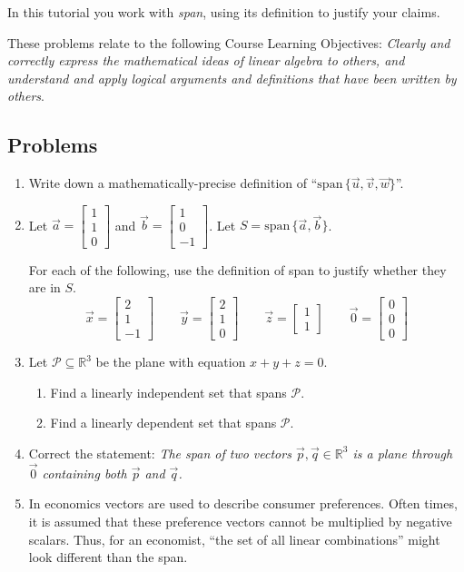 \documentclass[red]{tutorial}
\newcommand{\R}{\mathbb{R}}
\newcommand{\Span}{\mathrm{span}\,}
\newcommand{\mat}[1]{\begin{bmatrix}#1\end{bmatrix}}
\theoremstyle{definition}
\theoremstyle{theorem}
\begin{document}
	\begin{tutorial}
		\begin{objectives}
			In this tutorial you work with \emph{span}, using its definition to justify
			your claims.

	These problems relate to the following Course Learning Objectives:
			\textit{Clearly and correctly express the mathematical ideas of linear algebra to others, and 
			understand and apply logical arguments and definitions that have been written by others}.
		\end{objectives}

\subsection*{Problems}


\begin{enumerate}
	\item Write down a mathematically-precise definition of ``$\Span\{\vec u,\vec v,\vec w\}$''.
	\item Let $\vec a=\mat{1\\1\\0}$ and $\vec b=\mat{1\\0\\-1}$. Let $S=\Span\{\vec a,\vec b\}$.

		For each of the following, use the definition of span to justify whether they are in $S$.
		\[
			\vec x=\mat{2\\1\\-1}\qquad\vec y=\mat{2\\1\\0}\qquad\vec z=\mat{1\\1}\qquad\vec 0=\mat{0\\0\\0}
		\]

	\item Let $\mathcal P\subseteq \R^3$ be the plane with equation $x+y+z=0$.
		\begin{enumerate}
			\item Find a linearly independent set that spans $\mathcal P$.
			\item Find a linearly dependent set that spans $\mathcal P$.
		\end{enumerate}
	\item Correct the statement: \emph{The span of two vectors $\vec p,\vec q\in\R^3$ is a plane through $\vec 0$ 
		containing both $\vec p$ and $\vec q$.}
	\item In economics vectors are used to describe consumer preferences. Often times, it is assumed
		that these preference vectors cannot be multiplied by negative scalars. Thus, for an economist,
		``the set of all linear combinations'' might look different than the span.


\end{enumerate}
\end{tutorial}
\end{document}
